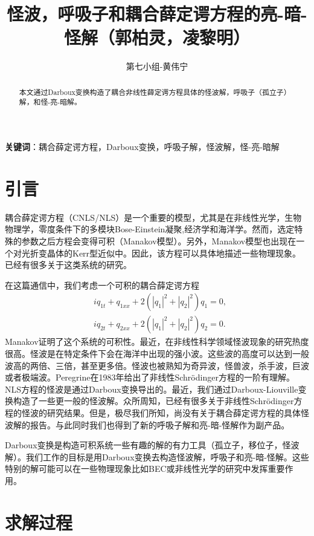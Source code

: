 \documentclass[11pt,a4paper]{ctexart}
\begin{document}
\title{怪波，呼吸子和耦合薛定谔方程的亮-暗-怪解（郭柏灵，凌黎明）}
\author{第七小组-黄伟宁}
\maketitle

\begin{abstract}
	本文通过Darboux变换构造了耦合非线性薛定谔方程具体的怪波解，呼吸子（孤立子）解，和怪-亮-暗解。
\end{abstract}

\textbf{关键词}：耦合薛定谔方程，Darboux变换，呼吸子解，怪波解，怪-亮-暗解

\section{引言}

耦合薛定谔方程（CNLS/NLS）是一个重要的模型，尤其是在非线性光学，生物物理学，零度条件下的多模块Bose-Einstein凝聚,经济学和海洋学。然而，选定特殊的参数之后方程会变得可积（Manakov模型）。另外，Manakov模型也出现在一个对光折变晶体的Kerr型近似中。因此，该方程可以具体地描述一些物理现象。已经有很多关于这类系统的研究。

在这篇通信中，我们考虑一个可积的耦合薛定谔方程
\begin{align*}
	 & iq_{1t} +q_{1xx} +2(|q_{1} |^{2}+|q_{2} |^{2})q_{1} =0,\tag{1a}   \\
	 & iq_{2t} +q_{2xx} +2(|q_{1} |^{2} +|q_{2} |^{2} )q_{2} =0.\tag{1b}
\end{align*}
Manakov证明了这个系统的可积性。最近，在非线性科学领域怪波现象的研究热度很高。怪波是在特定条件下会在海洋中出现的强小波。这些波的高度可以达到一般波高的两倍、三倍，甚至更多倍。怪波也被熟知为奇异波，怪兽波，杀手波，巨波或者极端波。Peregrine在1983年给出了非线性Schr\"{o}dinger方程的一阶有理解。NLS方程的怪波是通过Darboux变换导出的。最近，我们通过Darboux-Liouville变换构造了一些更一般的怪波解。众所周知，已经有很多关于非线性Schr\"{o}dinger方程的怪波的研究结果。但是，极尽我们所知，尚没有关于耦合薛定谔方程的具体怪波解的报告。与此同时我们也得到了新的呼吸子解和亮-暗-怪解作为副产品。

Darboux变换是构造可积系统一些有趣的解的有力工具（孤立子，移位子，怪波解）。我们工作的目标是用Darboux变换去构造怪波解，呼吸子和亮-暗-怪解。这些特别的解可能可以在一些物理现象比如BEC或非线性光学的研究中发挥重要作用。

\section{求解过程}
\end{document}
